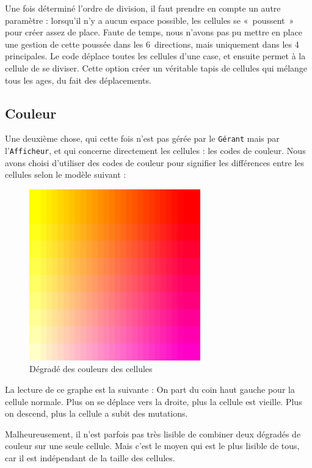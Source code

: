   
  Une fois déterminé l'ordre de division, il faut prendre en compte un autre paramètre : lorsqu'il n'y a aucun espace possible, les cellules se «~poussent~» pour créer assez de place. Faute de temps, nous n'avons pas pu mettre en place une gestion de cette poussée dans les 6 directions, mais uniquement dans les 4 principales. Le code déplace toutes les cellules d'une case, et ensuite permet à la cellule de se diviser. Cette option créer un véritable tapis de cellules qui mélange tous les ages, du fait des déplacements. \\

\subsection{Couleur}
  Une deuxième chose, qui cette fois n'est pas gérée par le \texttt{Gérant} mais par l'\texttt{Afficheur}, et qui concerne directement les cellules : les codes de couleur. Nous avons choisi d'utiliser des codes de couleur pour signifier les différences entre les cellules selon le modèle suivant : 
    \begin{figure}[H]
      \centering
      \includegraphics[width=20em]{Images/test.png}
      \caption{Dégradé des couleurs des cellules}
    \end{figure}
    
  La lecture de ce graphe est la suivante : On part du coin haut gauche pour la cellule normale. Plus on se déplace vers la droite, plus la cellule est vieille. Plus on descend, plus la cellule a subit des mutations.
  
  Malheureusement, il n'est parfois pas très lisible de combiner deux dégradés de couleur sur une seule cellule. Mais c'est le moyen qui est le plus lisible de tous, car il est indépendant de la taille des cellules.
  
